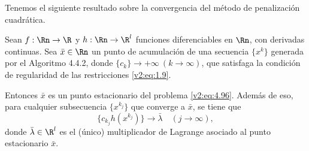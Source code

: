 Tenemos el siguiente resultado sobre la convergencia del método de penalización cuadrática.

\begin{theorem}\label{v2:thm:4.4.2}
    Sean $f: \Rn \to \R$ y $h: \Rn \to \R^l$ funciones diferenciables en $\Rn$, con derivadas continuas. Sea $\bar{x} \in \Rn$ un punto de acumulación de una secuencia $\{x^k\}$ generada por el Algoritmo 4.4.2, donde $\{c_k\} \to +\infty \ (k \to \infty)$, que satisfaga la condición de regularidad de las restricciones \eqref{v2:eq:1.9}.
    
    Entonces $\bar{x}$ es un punto estacionario del problema \eqref{v2:eq:4.96}. Además de eso, para cualquier subsecuencia $\{x^{k_j}\}$ que converge a $\bar{x}$, se tiene que
    \begin{equation}
        \{c_{k_j} h(x^{k_j})\} \to \bar{\lambda} \quad (j \to \infty),
        \label{v2:eq:4.106}
    \end{equation}
    donde $\bar{\lambda} \in \R^l$ es el (único) multiplicador de Lagrange asociado al punto estacionario $\bar{x}$.
\end{theorem}


